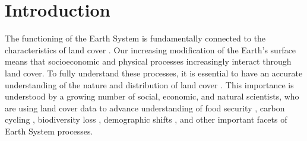 \documentclass[a4paper]{article}
\begin{document}
\linenumbers

\section*{Introduction}
\vspace{-0.3 cm}
The functioning of the Earth System is fundamentally connected to the characteristics of land cover \citep{lambin_modelling_1997}. Our increasing modification of the Earth's surface \citep{lambin_dynamics_2003} means that socioeconomic and physical processes increasingly interact through land cover. To fully understand these processes, it is essential to have an accurate understanding of the nature and distribution of land cover \citep{verburg_challenges_2011}. This importance is understood by a growing number of social, economic, and natural scientists, who are using land cover data to advance understanding of food security \citep{lark_cropland_2015,wright_recent_2013, licker_mind_2010}, carbon cycling \citep{asner_high-resolution_2010, gaveau_major_2014}, biodiversity loss \citep{newbold_global_2015, luoto_predicting_2004}, demographic shifts \citep{linard_assessing_2010}, and other important facets of Earth System processes. 
\end{document}
